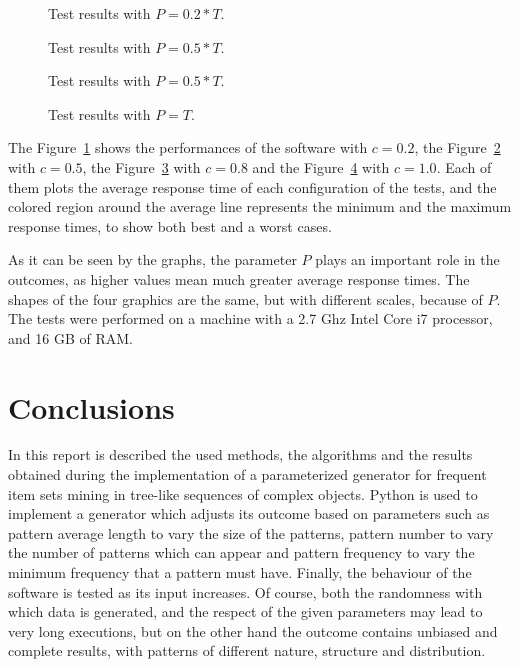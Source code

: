\documentclass{acm_proc_article-sp-sigmod09}
\begin{document}
\begin{figure}
\centering
{}
\caption{Test results with $P = 0.2 * T$.}
\label{fig:zerotwo}
\end{figure}

\begin{figure}
\centering
{}
\caption{Test results with $P = 0.5 * T$.}
\label{fig:zerofive}
\end{figure}

\begin{figure}
\centering
{}
\caption{Test results with $P = 0.5 * T$.}
\label{fig:zeroeight}
\end{figure}

\begin{figure}
\centering
{}
\caption{Test results with $P = T$.}
\label{fig:one}
\end{figure}

The Figure~\ref{fig:zerotwo} shows the performances of the software with $c = 0.2$, the Figure~\ref{fig:zerofive} with $c = 0.5$, the Figure~\ref{fig:zeroeight} with $c = 0.8$ and the Figure~\ref{fig:one} with $c = 1.0$. Each of them plots the average response time of each configuration of the tests, and the colored region around the average line represents the minimum and the maximum response times, to show both best and a worst cases.

As it can be seen by the graphs, the parameter $P$ plays an important role in the outcomes, as higher values mean much greater average response times. The shapes of the four graphics are the same, but with different scales, because of $P$. The tests were performed on a machine with a 2.7 Ghz Intel Core i7 processor, and 16 GB of RAM.

\section{Conclusions}
In this report is described the used methods, the algorithms and the results obtained during the implementation of a parameterized generator for frequent item sets mining in tree-like sequences of complex objects. Python is used to implement a generator which adjusts its outcome based on parameters such as pattern average length to vary the size of the patterns, pattern number to vary the number of patterns which can appear and pattern frequency to vary the minimum frequency that a pattern must have. Finally, the behaviour of the software is tested as its input increases. Of course, both the randomness with which data is generated, and the respect of the given parameters may lead to very long executions, but on the other hand the outcome contains unbiased and complete results, with patterns of different nature, structure and distribution.
\end{document}
